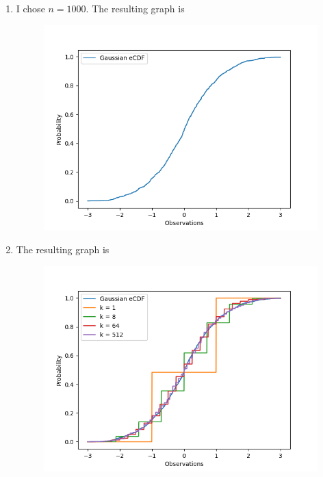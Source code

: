 \documentclass[submit]{harvardml}
\begin{document}
\begin{enumerate}
\begin{enumerate}
  \newpage
  \item 
  I chose $n=1000$. The resulting graph is
  \begin{figure}[h]
  \includegraphics[width=15cm]{ps0_6_2_a}
  \centering
  \end{figure}

  \newpage
  \item 
  The resulting graph is
  \begin{figure}[h]
  \includegraphics[width=15cm]{ps0_6_2_b}
  \centering
  \end{figure}
\end{enumerate}

\end{enumerate}
\end{document}
